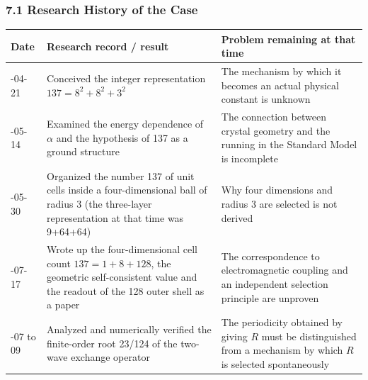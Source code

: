 \documentclass[
  a4paper,
]{article}
\newcounter{none} %
\begin{document}
\subsubsection{7.1 Research History of the
Case}\label{research-history-of-the-case}

{\def\LTcaptype{none} %
\begin{longtable}[]{@{}
  >{\raggedright\arraybackslash}p{}
  >{\raggedright\arraybackslash}p{}
  >{\raggedright\arraybackslash}p{}@{}}
\toprule\noalign{}
\begin{minipage}[b]{\linewidth}\raggedright
Date
\end{minipage} & \begin{minipage}[b]{\linewidth}\raggedright
Research record / result
\end{minipage} & \begin{minipage}[b]{\linewidth}\raggedright
Problem remaining at that time
\end{minipage} \\
\midrule\noalign{}
\endhead
\bottomrule\noalign{}
\endlastfoot
2026-04-21 & Conceived the integer representation \(137=8^2+8^2+3^2\) &
The mechanism by which it becomes an actual physical constant is
unknown \\
2026-05-14 & Examined the energy dependence of \(\alpha\) and the
hypothesis of 137 as a ground structure & The connection between crystal
geometry and the running in the Standard Model is incomplete \\
2026-05-30 & Organized the number 137 of unit cells inside a
four-dimensional ball of radius 3 (the three-layer representation at
that time was 9+64+64) & Why four dimensions and radius 3 are selected
is not derived \\
2026-07-17 & Wrote up the four-dimensional cell count \(137=1+8+128\),
the geometric self-consistent value and the readout of the 128 outer
shell as a paper & The correspondence to electromagnetic coupling and an
independent selection principle are unproven \\
2026-07 to 09 & Analyzed and numerically verified the finite-order root
23/124 of the two-wave exchange operator & The periodicity obtained by
giving \(R\) must be distinguished from a mechanism by which \(R\) is
selected spontaneously \\
\end{longtable}
}
\end{document}
